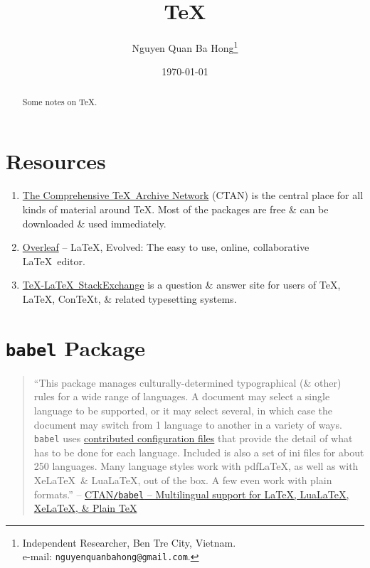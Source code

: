 \documentclass{article}
\title{\TeX}
\author{Nguyen Quan Ba Hong\footnote{Independent Researcher, Ben Tre City, Vietnam.\\e-mail: \texttt{nguyenquanbahong@gmail.com}.}}
\date{\today}
\numberwithin{equation}{section}
\begin{document}
\maketitle
\begin{abstract}
	Some notes on \TeX.
\end{abstract}
\tableofcontents


\section{Resources}

\begin{enumerate}
	\item \href{https://ctan.org/}{The Comprehensive \TeX\ Archive Network} (CTAN) is the central place for all kinds of material around \TeX. Most of the packages are free \& can be downloaded \& used immediately.
	\item \href{https://www.overleaf.com/}{Overleaf} -- \LaTeX, Evolved: The easy to use, online, collaborative \LaTeX\ editor.
	\item \href{https://tex.stackexchange.com/}{\TeX-\LaTeX\ StackExchange} is a question \& answer site for users of \TeX, \LaTeX, ConTeXt, \& related typesetting systems.
\end{enumerate}


\section{\texttt{babel} Package}
\begin{quotation}
	``This package manages culturally-determined typographical (\& other) rules for a wide range of languages. A document may select a single language to be supported, or it may select several, in which case the document may switch from 1 language to another in a variety of ways. \texttt{babel} uses \href{https://ctan.org/pkg/babel-contrib}{contributed configuration files} that provide the detail of what has to be done for each language. Included is also a set of ini files for about 250 languages. Many language styles work with pdf\LaTeX, as well as with Xe\LaTeX\ \& Lua\LaTeX, out of the box. A few even work with plain formats.'' -- \href{https://ctan.org/pkg/babel}{CTAN\texttt{/}\texttt{babel} -- Multilingual support for \LaTeX, Lua\LaTeX, Xe\LaTeX, \& Plain \TeX}
\end{quotation}
\end{document}

